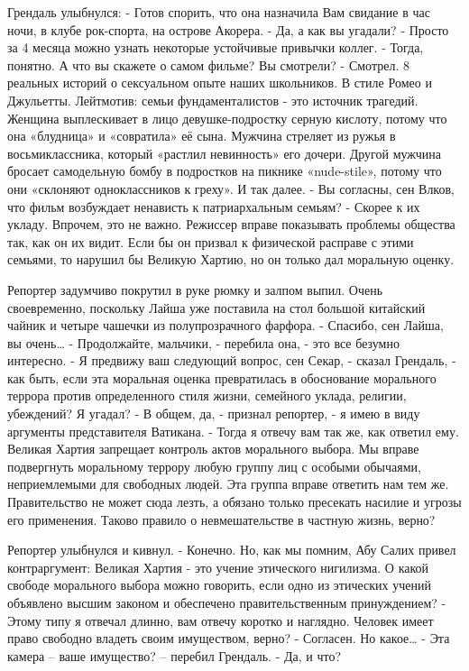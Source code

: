 \documentclass[10pt,final]{book}
\begin{document}
Грендаль улыбнулся:
- Готов спорить, что она назначила Вам свидание в час ночи, в клубе рок-спорта, на острове Акорера.
- Да, а как вы угадали?
- Просто за 4 месяца можно узнать некоторые устойчивые привычки коллег.
- Тогда, понятно. А что вы скажете о самом фильме? Вы смотрели?
- Смотрел. 8 реальных историй о сексуальном опыте наших школьников. В стиле Ромео и Джульетты. Лейтмотив: семьи фундаменталистов - это источник трагедий. Женщина выплескивает в лицо девушке-подростку серную кислоту, потому что она «блудница» и «совратила» её сына. Мужчина стреляет из ружья в восьмиклассника, который «растлил невинность» его дочери. Другой мужчина бросает самодельную бомбу в подростков на пикнике «nude-stile», потому что они «склоняют одноклассников к греху». И так далее.
- Вы согласны, сен Влков, что фильм возбуждает ненависть к патриархальным семьям?
- Скорее к их укладу. Впрочем, это не важно. Режиссер вправе показывать проблемы общества так, как он их видит. Если бы он призвал к физической расправе с этими семьями, то нарушил бы Великую Хартию, но он только дал моральную оценку.

Репортер задумчиво покрутил в руке рюмку и залпом выпил. Очень своевременно, поскольку Лайша уже поставила на стол большой китайский чайник и четыре чашечки из полупрозрачного фарфора.
- Спасибо, сен Лайша, вы очень\ldots{}
- Продолжайте, мальчики, - перебила она, - это все безумно интересно.
- Я предвижу ваш следующий вопрос, сен Секар, - сказал Грендаль, - как быть, если эта моральная оценка превратилась в обоснование морального террора против определенного стиля жизни, семейного уклада, религии, убеждений? Я угадал?
- В общем, да, - признал репортер, - я имею в виду аргументы представителя Ватикана.
- Тогда я отвечу вам так же, как ответил ему. Великая Хартия запрещает контроль актов морального выбора. Мы вправе подвергнуть моральному террору любую группу лиц с особыми обычаями, неприемлемыми для свободных людей. Эта группа вправе ответить нам тем же. Правительство не может сюда лезть, а обязано только пресекать насилие и угрозы его применения. Таково правило о невмешательстве в частную жизнь, верно?

Репортер улыбнулся и кивнул.
- Конечно. Но, как мы помним, Абу Салих привел контраргумент: Великая Хартия - это учение этического нигилизма. О какой свободе морального выбора можно говорить, если одно из этических учений объявлено высшим законом и обеспечено правительственным принуждением?
- Этому типу я отвечал длинно, вам отвечу коротко и наглядно. Человек имеет право свободно владеть своим имуществом, верно?
- Согласен. Но какое\ldots{}
- Эта камера -- ваше имущество? -- перебил Грендаль.
- Да, и что?
\end{document}
